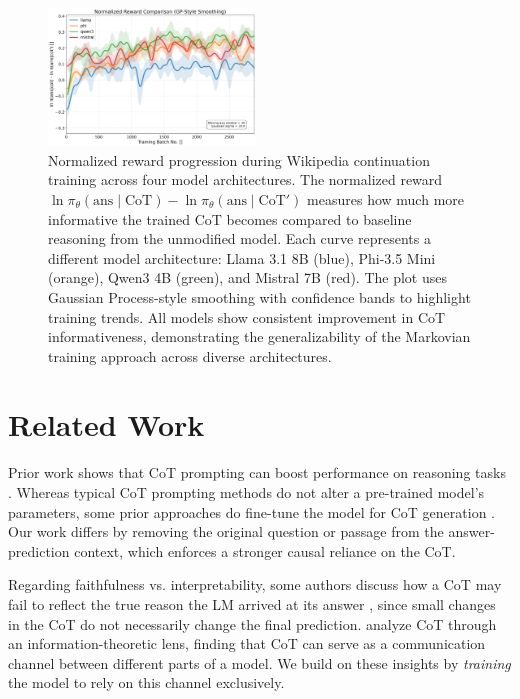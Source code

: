 \documentclass[letterpaper]{article} %
\begin{document}
\begin{figure}[t]
  \centering
    \includegraphics[width=0.49\textwidth]{Figures/combined_normalized_reward_gp_smoothed.png}
    \caption{Normalized reward progression during Wikipedia continuation training across four model architectures. The normalized reward $\ln \pi_\theta(\text{ans} \mid \text{CoT}) - \ln \pi_\theta(\text{ans} \mid \text{CoT}')$ measures how much more informative the trained CoT becomes compared to baseline reasoning from the unmodified model. Each curve represents a different model architecture: Llama 3.1 8B (blue), Phi-3.5 Mini (orange), Qwen3 4B (green), and Mistral 7B (red). The plot uses Gaussian Process-style smoothing with confidence bands to highlight training trends. All models show consistent improvement in CoT informativeness, demonstrating the generalizability of the Markovian training approach across diverse architectures.}
    \label{fig:loss}
\end{figure}

\section{Related Work}
\label{sec:related_work}

Prior work shows that CoT prompting can boost performance on reasoning tasks \citep{wei2022chain, nye2022show}.
Whereas typical CoT prompting methods do not alter a pre-trained model's parameters, some prior approaches do fine-tune the model for CoT generation \citep{eric_star2022, zelikman2024quietstar, deepseekai2025}. Our work differs by removing the original question or passage from the answer-prediction context, which enforces a stronger causal reliance on the CoT.

Regarding faithfulness vs. interpretability, some authors discuss how a CoT may fail to reflect the true reason the LM arrived at its answer \citep{lanham2023measuring, turpin2023language}, since small changes in the CoT do not necessarily change the final prediction. \citet{zhou2023understanding} analyze CoT through an information-theoretic lens, finding that CoT can serve as a communication channel between different parts of a model. We build on these insights by \emph{training} the model to rely on this channel exclusively.
\end{document}
